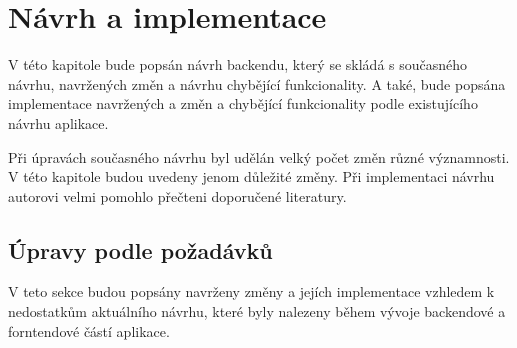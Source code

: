 \chapter{Návrh a implementace}\label{navrh}
V této kapitole bude popsán návrh backendu, který se skládá s současného návrhu, navržených změn a návrhu chybějící funkcionality. A také, bude popsána implementace navržených a změn a chybějící funkcionality podle existujícího návrhu aplikace.

Při úpravách současného návrhu byl udělán velký počet změn různé významnosti. V této kapitole budou uvedeny jenom důležité změny. Při implementaci návrhu autorovi velmi pomohlo přečteni doporučené literatury.\cite{pro-spring-boot-2}

\section{Úpravy podle požadávků}\label{navrh:upravy}
    V teto sekce budou popsány navrženy změny a jejích implementace vzhledem k nedostatkům aktuálního návrhu, které byly nalezeny během vývoje backendové a forntendové částí aplikace. 
    
